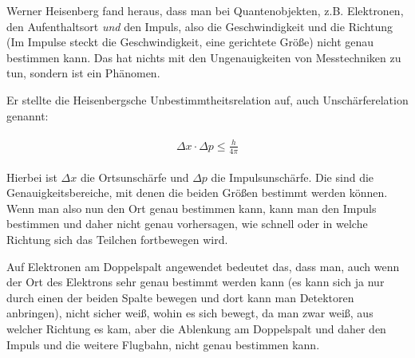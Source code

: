 Werner Heisenberg fand heraus, dass man bei Quantenobjekten, z.B. Elektronen, den Aufenthaltsort \emph{und} den Impuls, also die Geschwindigkeit und die Richtung (Im Impulse steckt die Geschwindigkeit, eine gerichtete Größe) nicht genau bestimmen kann. Das hat nichts mit den Ungenauigkeiten von Messtechniken zu tun, sondern ist ein Phänomen.

Er stellte die Heisenbergsche Unbestimmtheitsrelation auf, auch Unschärferelation genannt:

\begin{align}
\begin{split}
	\Delta x \cdot \Delta p \le \frac{h}{4\pi}
\end{split}
\end{align}

Hierbei ist $\Delta x$ die Ortsunschärfe und $\Delta p$ die Impulsunschärfe. Die sind die Genauigkeitsbereiche, mit denen die beiden Größen bestimmt werden können. Wenn man also nun den Ort genau bestimmen kann, kann man den Impuls bestimmen und daher nicht genau vorhersagen, wie schnell oder in welche Richtung sich das Teilchen fortbewegen wird.

Auf Elektronen am Doppelspalt angewendet bedeutet das, dass man, auch wenn der Ort des Elektrons sehr genau bestimmt werden kann (es kann sich ja nur durch einen der beiden Spalte bewegen und dort kann man Detektoren anbringen), nicht sicher weiß, wohin es sich bewegt, da man zwar weiß, aus welcher Richtung es kam, aber die Ablenkung am Doppelspalt und daher den Impuls und die weitere Flugbahn, nicht genau bestimmen kann.